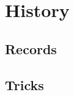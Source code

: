 \chapter{History}
\label{cha:history}

\section{Records}
\label{sec:records}


\section{Tricks}
\label{sec:tricks}

